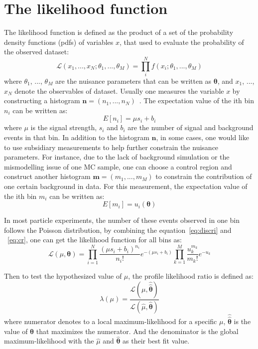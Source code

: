 \section{The likelihood function}

The likelihood function is defined as the product of a set of the probability density functions (pdfs) of variables $x$, that used to evaluate the probability of the observed dataset:
\begin{equation}\label{eq:likelihoodf}
    \mathcal{L} (x_{1}, ..., x_{N}; \theta_{1}, ..., \theta_{M}) = \prod_{i}^{N} f(x_{i}; \theta_{1}, ..., \theta_{M})
\end{equation}
where $\theta_{1}$, ..., $\theta_{M}$ are the nuisance parameters that can be written as $\pmb{\theta}$,
and $x_{1}$, ..., $x_{N}$ denote the observables of dataset. 
Usually one measures the variable $x$ by constructing a histogram $\pmb{n} = (n_{1}, ..., n_{N})$~\cite{Cowan:2010js}.
The expectation value of the ith bin $n_{i}$ can be written as:
\begin{equation}\label{eq:discri}
    E[n_{i}] = \mu s_{i} + b_{i}
\end{equation}
where $\mu$ is the signal strength, $s_{i}$ and $b_{i}$ are the number of signal and background events in that bin.
In addition to the histogram $\pmb{n}$, in some cases, one would like to use subsidiary measurements to help further constrain the nuisance parameters.
For instance, due to the lack of background simulation or the mismodelling issue of one MC sample, one can choose a control region and construct another histogram $\pmb{m} = (m_{1}, ..., m_{M})$ to constrain the contribution of one certain background in data.
For this measurement, the expectation value of the ith bin $m_{i}$ can be written as:
\begin{equation}\label{eq:cr}
    E[m_i] = u_i(\pmb{\theta})
\end{equation}

In most particle experiments, the number of these events observed in one bin follows the Poisson distribution,
by combining the equation~\ref{eq:discri} and ~\ref{eq:cr}, one can get the likelihood function for all bins as:
\begin{equation}
    \mathcal{L} (\mu, \pmb{\theta}) = \prod_{i=1}^{N} \frac{(\mu s_{i} + b_{i})^{n_i}}{n_i !} e^{-(\mu s_{i} + b_{i})}
    \prod_{k=1}^{M} \frac{u_k^{m_k}}{m_k !} e^{-u_k}
\end{equation}

Then to test the hypothesized value of $\mu$, the profile likelihood ratio is defined as:
\begin{equation} \label{eq:lambda}
    \lambda (\mu) = \frac{\mathcal{L}(\mu, \pmb{\hat{\hat{\theta}}})}{\mathcal{L}(\hat{\mu}, \pmb{\hat{\theta}})}
\end{equation}
where numerator denotes to a local maximum-likelihood for a specific $\mu$, $\pmb{\hat{\hat{\theta}}}$ is the value of $\pmb{\theta}$ that maximizes the numerator.
And the denominator is the global maximum-likelihood with the $\hat{\mu}$ and $\pmb{\hat{\theta}}$ as their best fit value.
